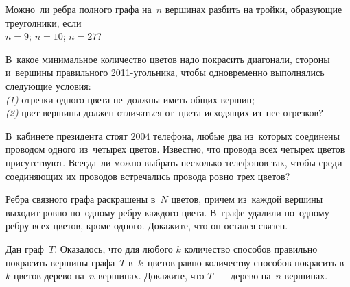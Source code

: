 \begin{problems}
\item
Можно~ли ребра полного графа на~$n$ вершинах разбить на тройки, образующие
треуголники, если
\\
\subproblem $n = 9$;
\quad
\subproblem $n = 10$;
\quad
\subproblem $n = 27$?

\item
В~какое минимальное количество цветов надо покрасить диагонали, стороны
и~вершины правильного 2011-угольника, чтобы одновременно выполнялись следующие
условия:
\\
\emph{(1)} отрезки одного цвета не~должны иметь общих вершин;
\\
\emph{(2)} цвет вершины должен отличаться от~цвета исходящих из~нее отрезков?

\item
В~кабинете президента стоят $2004$ телефона, любые два из~которых соединены
проводом одного из~четырех цветов.
Известно, что провода всех четырех цветов присутствуют.
Всегда~ли можно выбрать несколько телефонов так, чтобы среди соединяющих их
проводов встречались провода ровно трех цветов?

\item
Ребра связного графа раскрашены в~$N$ цветов, причем из~каждой вершины выходит
ровно по~одному ребру каждого цвета.
В~графе удалили по~одному ребру всех цветов, кроме одного.
Докажите, что он остался связен.

\item
Дан граф~$T$.
Оказалось, что для любого $k$ количество способов правильно покрасить вершины
графа~$T$ в~$k$~цветов равно количеству способов покрасить в~$k$ цветов дерево
на~$n$ вершинах.
Докажите, что $T$~--- дерево на~$n$ вершинах.

\end{problems}

